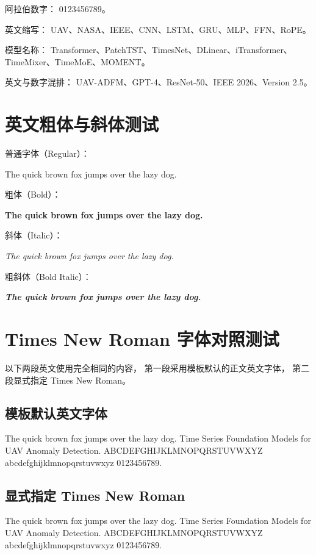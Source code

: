 阿拉伯数字：
0123456789。

英文缩写：
UAV、NASA、IEEE、CNN、LSTM、GRU、MLP、FFN、RoPE。

模型名称：
Transformer、PatchTST、TimesNet、DLinear、iTransformer、
TimeMixer、TimeMoE、MOMENT。

英文与数字混排：
UAV-ADFM、GPT-4、ResNet-50、IEEE 2026、Version 2.5。

\section{英文粗体与斜体测试}

普通字体（Regular）：

The quick brown fox jumps over the lazy dog.

粗体（Bold）：

\textbf{The quick brown fox jumps over the lazy dog.}

斜体（Italic）：

\textit{The quick brown fox jumps over the lazy dog.}

粗斜体（Bold Italic）：

\textbf{\textit{The quick brown fox jumps over the lazy dog.}}

\section{Times New Roman 字体对照测试}

以下两段英文使用完全相同的内容，
第一段采用模板默认的正文英文字体，
第二段显式指定 Times New Roman。

\subsection{模板默认英文字体}

The quick brown fox jumps over the lazy dog.
Time Series Foundation Models for UAV Anomaly Detection.
ABCDEFGHIJKLMNOPQRSTUVWXYZ abcdefghijklmnopqrstuvwxyz 0123456789.

\subsection{显式指定 Times New Roman}

\begingroup
{}

The quick brown fox jumps over the lazy dog.
Time Series Foundation Models for UAV Anomaly Detection.
ABCDEFGHIJKLMNOPQRSTUVWXYZ abcdefghijklmnopqrstuvwxyz 0123456789.

